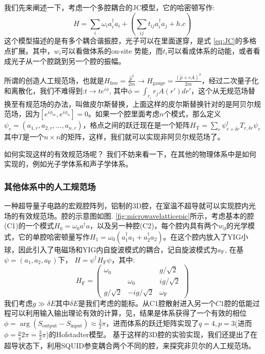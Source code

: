 \documentclass[supercite]{HustGraduPaper}
\begin{document}
   我们先来阐述一下，考虑一个多腔耦合的JC模型，它的哈密顿写作:
   \begin{equation}
   H = \sum_{i} \omega_i a_i^\dagger a_i  +( \sum_{ij} t_{ij} a_i^\dagger a_j + h.c)
   \end{equation}
   这个模型描述的是有多个耦合谐振腔，光子可以在里面遂穿，是式 \ref{eq:JC}的多格点扩展。其中，$w_i$可以看做体系的on-site 势能，而$t_i$可以看成体系的动能，或者看成光子从一个腔跳到另一个腔的振幅。
   
   所谓的创造人工规范场，也就是$H_{\text{free}} = \frac{\hat p^2}{2m} \to H_{\text{gauge}} = \frac{(\hat p + eA)^2}{2m}$，经过二次量子化和离散化，我们不难得到:$t \to te^{i \phi}$, 其中$\phi = \int_{r_i}{r_j} A(r') dr'$，这个从无规范场替换至有规范场的办法，叫做皮尔斯替换，上面这样的皮尔斯替换针对的是阿贝尔规范场，因为$[e^{i\phi_m},e^{i\phi_n}] = 0$。如果一个腔里面考虑$n$个模式，那么定义$\psi_r = (a_{1,r},a_{2,r},...,a_{n,r})$，格点之间的跃迁现在是一个矩阵$H_{\text{T}} = \sum_r \psi_{r + \delta r}^\dagger T_{r,\delta r} \psi_r$其中$T$是一个$n \times n$的矩阵，这样，我们就可以实现非阿贝尔规范场了。
   
   如何实现这样的有效规范场呢？ 我们不妨来看一下，在其他的物理体系中是如何实现的，例如光子学体系和声子学体系。
\subsubsection{其他体系中的人工规范场}
一种超导量子电路的宏观腔阵列，铝制的3D腔\cite{Sirois2015}，在室温不超导就可以实现腔内光场的有效规范场\cite{owens2018quarter,anderson2016engineering}。腔的示意图如图. \ref{fig:microwavelatticepic}所示，考虑基本的腔(C1)的一个模式$H_0 = \omega_0 a^\dagger a$，以及另一种腔(C2)，每个腔内具有两个$w_0$的光学模式，它的单腔哈密顿量写作$H_1  = \omega_0 (a^\dagger_1 a_1 + a^\dagger_2 a_2)$。在这个腔内放入了YIG小球，因此引入了电磁场和YIG内自旋波模式的耦合，记自旋波模式为$a_{\text{F}}$, 在基$\psi = (a_1,a_2,a_{\text{F}})$下， $H = \psi^\dagger H_{\text{F}} \psi$，其中:
\begin{equation}
H_{\text{F}} = \left(\begin{array}{ccc}
\omega_0 &  & g/\sqrt{2} \\ 
& \omega_0 & ig/\sqrt{2} \\ 
g/\sqrt{2} & -ig/\sqrt{2} & \omega_{\text{F}}
\end{array} \right)
\end{equation}
我们考虑$g\gg \delta E$其中$\delta E$是我们考虑的能标。从C1腔散射进入另一个$C1$腔的低能过程可以利用输入输出理论有效的计算\cite{anderson2016engineering}，见，结果是体系获得了一个有效的相位$\phi = \arg(S_{\text{output}} - S_{\text{input}}) \approx \frac{3}{2} \pi$，进而体系的跃迁矩阵实现了$q = 4, p =3$(进而$\phi = \frac{p}{q} 2\pi = \frac{3}{2} \pi$)的Hofstadter模型\cite{anderson2016engineering}。 基于这样的3D腔的实验实现，我们还提出了在超导状态下，利用SQUID参变耦合两个不同的腔，来探究非贝尔的人工规范场\cite{cai2018non}。
\end{document}
